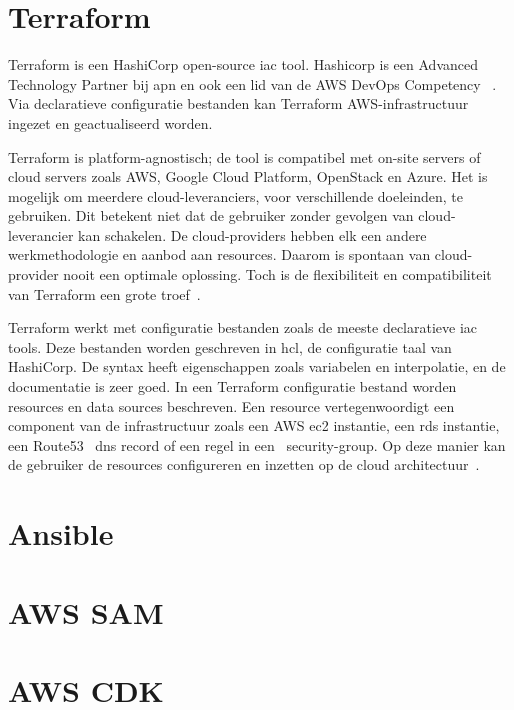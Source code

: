 \section{Terraform}
\label{subsec:service-terraform}

Terraform is een HashiCorp open-source \acrfull{iac} tool.
Hashicorp is een Advanced Technology Partner bij \acrfull{apn} en ook een lid van de AWS DevOps Competency ~\autocite{Campbell2018}.
Via declaratieve configuratie bestanden kan Terraform AWS-infrastructuur ingezet en geactualiseerd worden.

Terraform is platform-agnostisch;
de tool is compatibel met on-site servers of cloud servers zoals AWS, Google Cloud Platform, OpenStack en Azure.
Het is mogelijk om meerdere cloud-leveranciers, voor verschillende doeleinden, te gebruiken.
Dit betekent niet dat de gebruiker zonder gevolgen van cloud-leverancier kan schakelen.
De cloud-providers hebben elk een andere werkmethodologie en aanbod aan resources.
Daarom is spontaan van cloud-provider nooit een optimale oplossing.
Toch is de flexibiliteit en compatibiliteit van Terraform een grote troef~\autocite{Szalski2019}.

Terraform werkt met configuratie bestanden zoals de meeste declaratieve \acrshort{iac} tools.
Deze bestanden worden geschreven in \acrfull{hcl}, de configuratie taal van HashiCorp.
De syntax heeft eigenschappen zoals variabelen en interpolatie, en de documentatie is zeer goed.
In een Terraform configuratie bestand worden resources en data sources beschreven.
Een resource vertegenwoordigt een component van de infrastructuur zoals een AWS \acrshort{ec2} instantie, een \acrshort{rds} instantie, een Route53 ~\acrshort{dns} record of een regel in een ~\gls{security-group}.
Op deze manier kan de gebruiker de resources configureren en inzetten op de cloud architectuur~\autocite{Szalski2019}.

\section{Ansible}
\label{subsec:service-ansible}


\section{AWS SAM}
\label{subsec:service-sam}


\section{AWS CDK}
\label{subsec:service-cdk}

